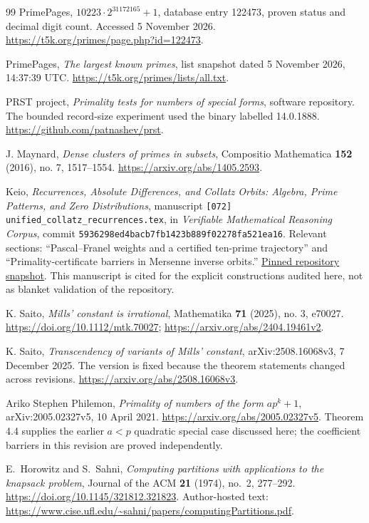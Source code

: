 \documentclass[11pt,a4paper]{article}
\theoremstyle{definition}\newtheorem{definition}[theorem]{Definition}
\theoremstyle{remark}\newtheorem{remark}[theorem]{Remark}
\begin{document}
\begin{thebibliography}{99}
PrimePages, \emph{$10223\cdot2^{31172165}+1$}, database entry 122473,
proven status and decimal digit count. Accessed 5 November 2026.
\url{https://t5k.org/primes/page.php?id=122473}.

PrimePages, \emph{The largest known primes}, list snapshot dated
5 November 2026, 14:37:39 UTC.
\url{https://t5k.org/primes/lists/all.txt}.

PRST project, \emph{Primality tests for numbers of special forms},
software repository. The bounded record-size experiment used the binary
labelled 14.0.1888. \url{https://github.com/patnashev/prst}.

J. Maynard, \emph{Dense clusters of primes in subsets}, Compositio
Mathematica \textbf{152} (2016), no. 7, 1517--1554.
\url{https://arxiv.org/abs/1405.2593}.

Keio, \emph{Recurrences, Absolute Differences, and Collatz Orbits:
Algebra, Prime Patterns, and Zero Distributions}, manuscript
\texttt{[072] unified\_collatz\_recurrences.tex}, in
\emph{Verifiable Mathematical Reasoning Corpus},
commit \texttt{5936298ed4bacb7fb1423b889f02278fa521ea16}.
Relevant sections: ``Pascal--Franel weights and a certified ten-prime
trajectory'' and ``Primality-certificate barriers in Mersenne inverse
orbits.''
\href{https://github.com/QEEDDD/Verifiable-Mathematical-Reasoning-Corpus/tree/5936298ed4bacb7fb1423b889f02278fa521ea16}{Pinned repository snapshot}.
This manuscript is cited for the explicit constructions audited here,
not as blanket validation of the repository.

K. Saito, \emph{Mills' constant is irrational}, Mathematika \textbf{71}
(2025), no. 3, e70027.
\url{https://doi.org/10.1112/mtk.70027};
\url{https://arxiv.org/abs/2404.19461v2}.

K. Saito, \emph{Transcendency of variants of Mills' constant},
arXiv:2508.16068v3, 7 December 2025. The version is fixed because the
theorem statements changed across revisions.
\url{https://arxiv.org/abs/2508.16068v3}.


Ariko Stephen Philemon, \emph{Primality of numbers of the form
$ap^k+1$}, arXiv:2005.02327v5, 10 April 2021.
\url{https://arxiv.org/abs/2005.02327v5}.
Theorem 4.4 supplies the earlier $a<p$ quadratic special case discussed
here; the coefficient barriers in this revision are proved independently.

E.~Horowitz and S.~Sahni,
\emph{Computing partitions with applications to the knapsack problem},
Journal of the ACM \textbf{21} (1974), no.~2, 277--292.
\url{https://doi.org/10.1145/321812.321823}.
Author-hosted text:
\url{https://www.cise.ufl.edu/~sahni/papers/computingPartitions.pdf}.


\end{thebibliography}
\end{document}
